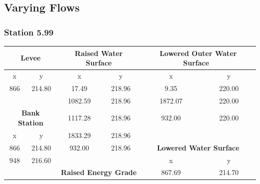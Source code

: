 \subsection{Varying Flows}
\subsubsection{Station 5.99}
\begin{center}

\begin{tabular}{|cc|cc|cc|} 
    \hline
    \multicolumn{2}{|c|}{\textbf{Levee }}                    & \multicolumn{2}{c|}{\textbf{Raised Water Surface }}  & \multicolumn{2}{c|}{\textbf{Lowered Outer Water Surface~ }}  \\ 
    \hline
    x      & y                                               & x       & y                                          & x       & y                                                  \\
    866    & 214.80                                          & 17.49   & 218.96                                     & 9.35    & 220.00                                             \\
           &                                                 & 1082.59 & 218.96                                     & 1872.07 & 220.00                                             \\
    \multicolumn{2}{|c|}{\textbf{Bank Station }}             & 1117.28 & 218.96                                     & 932.00  & 220.00                                             \\ 
    \cline{1-2}
    x      & y                                               & 1833.29 & 218.96                                     &         &                                                    \\
    866    & 214.80                                          & 932.00  & 218.96                                     & \multicolumn{2}{c|}{\textbf{Lowered Water Surface }}         \\ 
    \cline{5-6}
    948    & 216.60                                          &         &                                            & x       & y                                                  \\
           &                                                 & \multicolumn{2}{c|}{\textbf{Raised Energy Grade }}   & 867.69  & 214.70                                             \\ 

\end{tabular}
\end{center}
